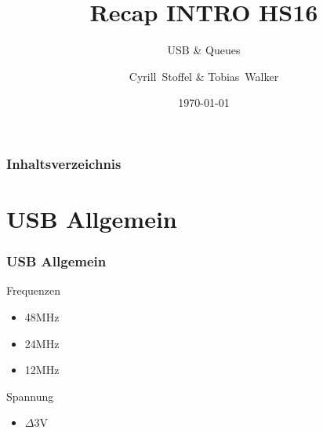 \documentclass{beamer}
\title{Recap INTRO HS16}
\subtitle{USB \& Queues}
\author[Stoffel, Walker] %
{Cyrill~Stoffel \& Tobias~Walker}
\date{\today}
\begin{document}
	
	\frame{\titlepage}

	
	\begin{frame}
		\frametitle{Inhaltsverzeichnis}
		\tableofcontents
	\end{frame}

	\section{USB Allgemein}
	\begin{frame}
			\frametitle{USB Allgemein}
				Frequenzen
				\begin{itemize}
					\item 48MHz
					\item 24MHz
					\item 12MHz
				\end{itemize}
				Spannung
				\begin{itemize}
					\item $\Delta 3$V													
				\end{itemize}
	\end{frame}
	
\end{document}
